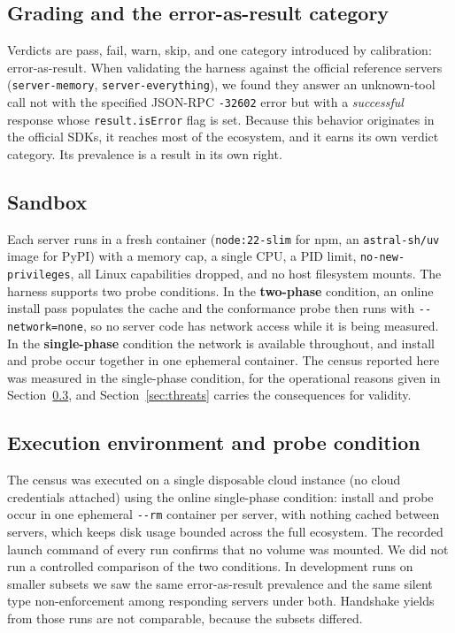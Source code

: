 \subsection{Grading and the error-as-result category}
Verdicts are \textsf{pass}, \textsf{fail}, \textsf{warn}, \textsf{skip}, and one
category introduced by calibration: \textsf{error-as-result}. When validating the
harness against the official reference servers (\texttt{server-memory},
\texttt{server-everything}), we found they answer an unknown-tool call not with the
specified JSON-RPC \texttt{-32602} error but with a \emph{successful} response whose
\texttt{result.isError} flag is set. Because this behavior originates in the
official SDKs, it reaches most of the ecosystem, and it earns its own verdict
category. Its prevalence is a result in its own right.

\subsection{Sandbox}
Each server runs in a fresh container (\texttt{node:22-slim} for npm, an \texttt{astral-sh/uv} image for
PyPI) with a memory cap, a single CPU, a PID limit, \texttt{no-new-privileges}, all
Linux capabilities dropped, and no host filesystem mounts. The harness supports two
probe conditions. In the \textbf{two-phase}
condition, an online install pass populates the cache and the conformance probe then
runs with \texttt{-{}-network=none}, so no server code has network access while it is
being measured. In the \textbf{single-phase} condition the network is available
throughout, and install and probe occur together in one ephemeral container. The
census reported here was measured in the single-phase condition, for the operational
reasons given in Section~\ref{sec:method-env}, and Section~\ref{sec:threats} carries
the consequences for validity.

\subsection{Execution environment and probe condition}
\label{sec:method-env}
The census was executed on a single disposable cloud instance (no cloud credentials attached) using the online single-phase condition: install and probe occur
in one ephemeral \texttt{-{}-rm} container per server, with nothing cached between
servers, which keeps disk usage bounded across the full ecosystem. The recorded
launch command of every run confirms that no volume was mounted. We did not run a
controlled comparison of the two conditions. In development runs on smaller subsets
we saw the same error-as-result prevalence and the same silent type non-enforcement
among responding servers under both. Handshake yields from those runs are not
comparable, because the subsets differed.

